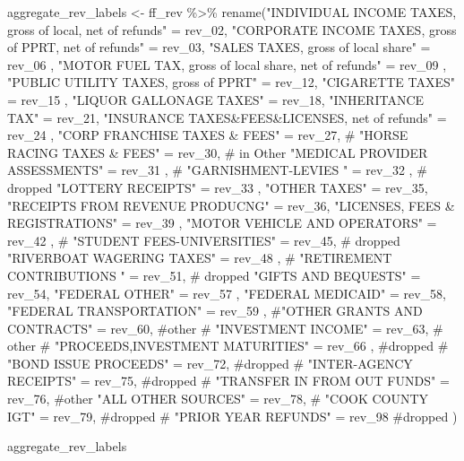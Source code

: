 \documentclass[
  letterpaper,
  DIV=11,
  numbers=noendperiod]{scrreport}
\newenvironment{Shaded}{\begin{snugshade}}{\end{snugshade}}
\newcommand{\CommentTok}[1]{\textcolor[rgb]{0.37,0.37,0.37}{#1}}
\newcommand{\FunctionTok}[1]{\textcolor[rgb]{0.28,0.35,0.67}{#1}}
\newcommand{\NormalTok}[1]{\textcolor[rgb]{0.00,0.23,0.31}{#1}}
\newcommand{\OtherTok}[1]{\textcolor[rgb]{0.00,0.23,0.31}{#1}}
\newcommand{\SpecialCharTok}[1]{\textcolor[rgb]{0.37,0.37,0.37}{#1}}
\newcommand{\StringTok}[1]{\textcolor[rgb]{0.13,0.47,0.30}{#1}}
\begin{document}
\begin{Shaded}
\begin{Highlighting}[]
\NormalTok{aggregate\_rev\_labels }\OtherTok{\textless{}{-}}\NormalTok{ ff\_rev }\SpecialCharTok{\%\textgreater{}\%}
  \FunctionTok{rename}\NormalTok{(}\StringTok{"INDIVIDUAL INCOME TAXES, gross of local, net of refunds"} \OtherTok{=}\NormalTok{ rev\_02,}
         \StringTok{"CORPORATE INCOME TAXES, gross of PPRT, net of refunds"} \OtherTok{=}\NormalTok{ rev\_03,}
         \StringTok{"SALES TAXES, gross of local share"} \OtherTok{=}\NormalTok{ rev\_06 ,}
         \StringTok{"MOTOR FUEL TAX, gross of local share, net of refunds"} \OtherTok{=}\NormalTok{ rev\_09 ,}
         \StringTok{"PUBLIC UTILITY TAXES, gross of PPRT"} \OtherTok{=}\NormalTok{ rev\_12,}
         \StringTok{"CIGARETTE TAXES"} \OtherTok{=}\NormalTok{ rev\_15 ,}
         \StringTok{"LIQUOR GALLONAGE TAXES"} \OtherTok{=}\NormalTok{ rev\_18,}
         \StringTok{"INHERITANCE TAX"} \OtherTok{=}\NormalTok{ rev\_21,}
         \StringTok{"INSURANCE TAXES\&FEES\&LICENSES, net of refunds"} \OtherTok{=}\NormalTok{ rev\_24 ,}
         \StringTok{"CORP FRANCHISE TAXES \& FEES"} \OtherTok{=}\NormalTok{ rev\_27,}
       \CommentTok{\# "HORSE RACING TAXES \& FEES" = rev\_30,  \# in Other}
         \StringTok{"MEDICAL PROVIDER ASSESSMENTS"} \OtherTok{=}\NormalTok{ rev\_31 ,}
         \CommentTok{\# "GARNISHMENT{-}LEVIES " = rev\_32 , \# dropped}
         \StringTok{"LOTTERY RECEIPTS"} \OtherTok{=}\NormalTok{ rev\_33 ,}
         \StringTok{"OTHER TAXES"} \OtherTok{=}\NormalTok{ rev\_35,}
         \StringTok{"RECEIPTS FROM REVENUE PRODUCNG"} \OtherTok{=}\NormalTok{ rev\_36, }
         \StringTok{"LICENSES, FEES \& REGISTRATIONS"} \OtherTok{=}\NormalTok{ rev\_39 ,}
         \StringTok{"MOTOR VEHICLE AND OPERATORS"} \OtherTok{=}\NormalTok{ rev\_42 ,}
         \CommentTok{\#  "STUDENT FEES{-}UNIVERSITIES" = rev\_45,   \# dropped}
         \StringTok{"RIVERBOAT WAGERING TAXES"} \OtherTok{=}\NormalTok{ rev\_48 ,}
         \CommentTok{\# "RETIREMENT CONTRIBUTIONS " = rev\_51, \# dropped}
         \StringTok{"GIFTS AND BEQUESTS"} \OtherTok{=}\NormalTok{ rev\_54, }
         \StringTok{"FEDERAL OTHER"} \OtherTok{=}\NormalTok{ rev\_57 ,}
         \StringTok{"FEDERAL MEDICAID"} \OtherTok{=}\NormalTok{ rev\_58, }
         \StringTok{"FEDERAL TRANSPORTATION"} \OtherTok{=}\NormalTok{ rev\_59 ,}
         \CommentTok{\#"OTHER GRANTS AND CONTRACTS" = rev\_60, \#other}
       \CommentTok{\# "INVESTMENT INCOME" = rev\_63, \# other}
         \CommentTok{\# "PROCEEDS,INVESTMENT MATURITIES" = rev\_66 , \#dropped}
         \CommentTok{\# "BOND ISSUE PROCEEDS" = rev\_72,  \#dropped}
         \CommentTok{\# "INTER{-}AGENCY RECEIPTS" = rev\_75,  \#dropped}
      \CommentTok{\#  "TRANSFER IN FROM OUT FUNDS" = rev\_76,  \#other}
         \StringTok{"ALL OTHER SOURCES"} \OtherTok{=}\NormalTok{ rev\_78,}
         \CommentTok{\# "COOK COUNTY IGT" = rev\_79, \#dropped}
         \CommentTok{\# "PRIOR YEAR REFUNDS" = rev\_98 \#dropped}
\NormalTok{  ) }

\NormalTok{aggregate\_rev\_labels}
\end{Highlighting}
\end{Shaded}
\end{document}
